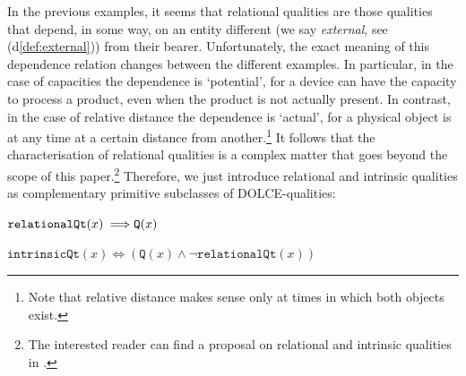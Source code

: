 \documentclass[sw]{iosart2x}
\newcommand{\bflist}{\begin{list}{}{\setlength{\topsep}{2mm}\setlength{\partopsep}{0mm}\setlength{\parsep}{0mm}\setlength{\leftmargin}{9mm}\setlength{\labelwidth}{8mm}}}
\newcommand{\eflist}{\end{list}}
\newcommand{\AxLabel}{\textrm{a}}
\newcommand{\DefLabel}{\textrm{d}}
\newcounter{cntax}
\newcommand{\myax}[1]{\refstepcounter{cntax}\begin{small}{\bf \AxLabel\thecntax\label{ax:#1}}\end{small}}
\newcounter{cntdef}
\newcommand{\mydf}[1]{\refstepcounter{cntdef}\begin{small}{\bf \DefLabel\thecntdef\label{def:#1}}\end{small}}
\newcommand{\mytext}[1]{``#1''}
\newcommand{\refdf}[1]{({\DefLabel}\ref{#1})}
\newcommand{\generalStyle}[1]{\texttt{#1}}
\newcommand{\uniRel}[2]{\generalStyle{#1}(#2)}
\newcommand{\myiff}{\Longleftrightarrow}
\newcommand{\myfi}{\hspace{0.9mm} \Longrightarrow}
\newcommand{\DOLCE}{\textsc{DOLCE}\xspace} %
\newcommand{\DOLCEQuality}[1]{\uniRel{Q}{#1}}
\newcommand{\RelationalQuality}[1]{\uniRel{relationalQt}{#1}}
\newcommand{\IntrinsicQuality}[1]{\uniRel{intrinsicQt}{#1}}
\newcommand{\firstTimeKeyWord}[1]{\textit{#1}}
\begin{document}

In the previous examples, it seems that relational qualities are those qualities that depend, in some way, on an entity different (we say \firstTimeKeyWord{external}, see \refdf{def:external}) from their bearer. Unfortunately, the exact meaning of this dependence relation changes between the different examples. In particular, in the case of capacities the dependence is `potential', for a device can have the capacity to process a product, even when the product is not actually present. In contrast, in the case of relative distance the dependence is `actual', for a physical object is at any time at a certain distance from another.\footnote{Note that relative distance makes sense only at times in which both objects exist.}
It follows that the characterisation of relational qualities is a complex matter that goes beyond the scope of this paper.\footnote{The interested reader can find a proposal on relational and intrinsic qualities in \cite{fonsecaRelationsOntologyDrivenConceptual2019}.} Therefore, we just introduce relational and intrinsic qualities as complementary primitive subclasses of \DOLCE-qualities: 
\bflist
  \item[\myax{relationalQtPartialDef}] $ \RelationalQuality{x} \myfi \DOLCEQuality{x} $ 
  \item[\mydf{intrinsicQtPartialDef}] $ \IntrinsicQuality{x} \myiff  ( \DOLCEQuality{x} \land \neg  \RelationalQuality{x})$
\eflist
\end{document}
